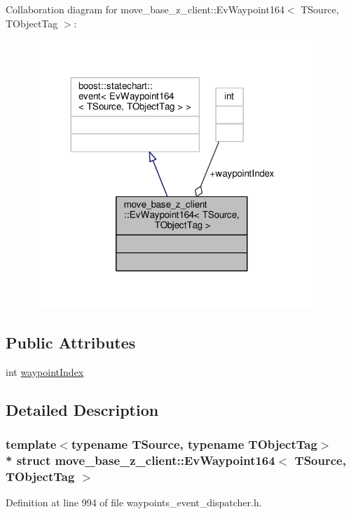 Collaboration diagram for move\+\_\+base\+\_\+z\+\_\+client\+:\+:Ev\+Waypoint164$<$ T\+Source, T\+Object\+Tag $>$\+:\nopagebreak
\begin{figure}[H]
\begin{center}
\leavevmode
\includegraphics[width=299pt]{structmove__base__z__client_1_1EvWaypoint164__coll__graph}
\end{center}
\end{figure}
\subsection*{Public Attributes}
\begin{DoxyCompactItemize}
\item 
int \hyperlink{structmove__base__z__client_1_1EvWaypoint164_acdb61955ec791f89f1906789b80be87c}{waypoint\+Index}
\end{DoxyCompactItemize}


\subsection{Detailed Description}
\subsubsection*{template$<$typename T\+Source, typename T\+Object\+Tag$>$\\*
struct move\+\_\+base\+\_\+z\+\_\+client\+::\+Ev\+Waypoint164$<$ T\+Source, T\+Object\+Tag $>$}



Definition at line 994 of file waypoints\+\_\+event\+\_\+dispatcher.\+h.



